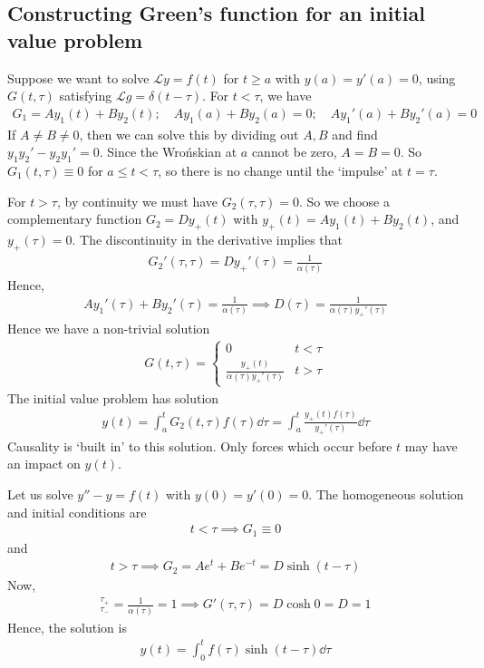 \subsection{Constructing Green's function for an initial value problem}
Suppose we want to solve $\mathcal L y = f(t)$ for $t \geq a$ with $y(a) = y'(a) = 0$, using $G(t, \tau)$ satisfying $\mathcal L g = \delta(t - \tau)$.
For $t < \tau$, we have
\begin{align*}
	G_1 = A y_1(t) + B y_2(t);\quad A y_1(a) + B y_2(a) = 0;\quad A y_1'(a) + B y_2'(a) = 0
\end{align*}
If $A \neq B \neq 0$, then we can solve this by dividing out $A, B$ and find $y_1 y_2' - y_2 y_1' = 0$.
Since the Wro\'nskian at $a$ cannot be zero, $A = B = 0$.
So $G_1(t,\tau) \equiv 0$ for $a \leq t < \tau$, so there is no change until the `impulse' at $t = \tau$.

For $t > \tau$, by continuity we must have $G_2(\tau, \tau) = 0$.
So we choose a complementary function $G_2 = D y_+(t)$ with $y_+(t) = A y_1(t) + B y_2(t)$, and $y_+(\tau) = 0$.
The discontinuity in the derivative implies that
\begin{align*}
	G_2'(\tau, \tau) = Dy_+'(\tau) = \frac{1}{\alpha(\tau)}
\end{align*}
Hence,
\begin{align*}
	A y_1'(\tau) + B y_2'(\tau) = \frac{1}{\alpha(\tau)} \implies D(\tau) = \frac{1}{\alpha(\tau) y_+'(\tau)}
\end{align*}
Hence we have a non-trivial solution
\begin{align*}
	G(t, \tau) = \begin{cases}
		0 & t < \tau \\
		\frac{y_+(t)}{\alpha(\tau) y_+'(\tau)} & t > \tau
	\end{cases}
\end{align*}
The initial value problem has solution
\begin{align*}
	y(t) = \int_a^t G_2(t, \tau) f(\tau) \dd{\tau} = \int_a^t \frac{y_+(t) f(\tau)}{y_+'(\tau)} \dd{\tau}
\end{align*}
Causality is `built in' to this solution.
Only forces which occur before $t$ may have an impact on $y(t)$.
\begin{example}
	Let us solve $y''-y = f(t)$ with $y(0) = y'(0) = 0$.
	The homogeneous solution and initial conditions are
	\begin{align*}
		t < \tau \implies G_1 \equiv 0
	\end{align*}
	and
	\begin{align*}
		t > \tau \implies G_2 = A e^t + Be^{-t} = D \sinh (t - \tau)
	\end{align*}
	Now,
	\begin{align*}
		[G']_{\tau_-}^{\tau_+} = \frac{1}{\alpha(\tau)} = 1 \implies G'(\tau, \tau) = D \cosh 0 = D = 1
	\end{align*}
	Hence, the solution is
	\begin{align*}
		y(t) = \int_0^t f(\tau) \sinh (t - \tau) \dd{\tau}
	\end{align*}
\end{example}